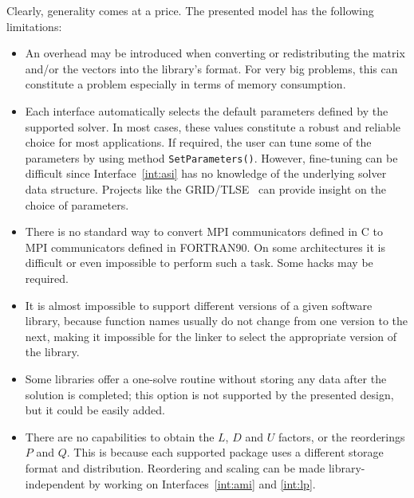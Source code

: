 \documentclass[acmtocl]{acmtrans2m}
\begin{document}
Clearly, generality comes at a price. The presented model has the following
limitations:
\begin{itemize}
\item
An overhead may be introduced when converting or redistributing the matrix and/or the
vectors into the library's format. For very big problems, this can constitute a
problem especially in terms of memory consumption.
\item 
Each interface automatically selects the default parameters defined by the
supported solver. In most cases, these values constitute a robust and reliable
choice for most applications. If required, the user can tune some of the
parameters by using method \verb!SetParameters()!. However, fine-tuning can be
difficult since Interface~\ref{int:asi} has no knowledge of the underlying
solver data structure. Projects like the GRID/TLSE~\cite{dayde04overview} can provide insight on
the choice of parameters.

\item There
  is no standard way to 
  convert MPI communicators defined in C to MPI communicators defined
  in FORTRAN90. On some architectures it is difficult or even
  impossible to perform such a task. Some hacks may be required.

\item 
It is almost impossible to support different versions of a given software
library, because
function names usually do not change from one version to the
next, making it impossible for the linker to select the
  appropriate version of the library.

%
%
\item
Some libraries offer a one-solve routine without storing any data after the
solution is completed; this option is not  supported
by the presented design, but it could be easily added.

\item
There are no capabilities to obtain the $L$, $D$ and $U$ factors, or the
reorderings $P$ and $Q$. This is because each supported package uses a
different storage format and distribution. Reordering and scaling can be made
library-independent by working on Interfaces~\ref{int:ami} and \ref{int:lp}.


\end{itemize}
\end{document}
